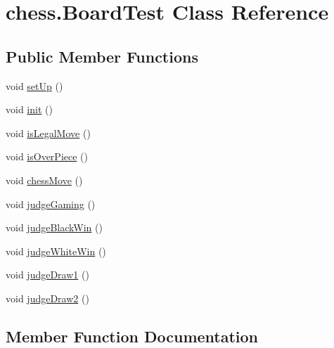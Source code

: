 \hypertarget{classchess_1_1_board_test}{}\section{chess.\+Board\+Test Class Reference}
\label{classchess_1_1_board_test}
\subsection*{Public Member Functions}
\begin{DoxyCompactItemize}
\item 
void \mbox{\hyperlink{classchess_1_1_board_test_acd0ea30fd3e9742c6b71a5ee60b65707}{set\+Up}} ()
\item 
void \mbox{\hyperlink{classchess_1_1_board_test_a74abc15f67e30a9464758c1bf5dccbff}{init}} ()
\item 
void \mbox{\hyperlink{classchess_1_1_board_test_abd189ec57b7236f5482df6d2121898e6}{is\+Legal\+Move}} ()
\item 
void \mbox{\hyperlink{classchess_1_1_board_test_a844fc9d2b643df169a9b74a1983ce9ba}{is\+Over\+Piece}} ()
\item 
void \mbox{\hyperlink{classchess_1_1_board_test_ad2614964ffa53b71ba2cccc28e103132}{chess\+Move}} ()
\item 
void \mbox{\hyperlink{classchess_1_1_board_test_ab027906c63e88c5024784d8f61f6c632}{judge\+Gaming}} ()
\item 
void \mbox{\hyperlink{classchess_1_1_board_test_ad40ac3593566417a81427839b45a0386}{judge\+Black\+Win}} ()
\item 
void \mbox{\hyperlink{classchess_1_1_board_test_a9eba77bc50638d378f650d30ea79f44b}{judge\+White\+Win}} ()
\item 
void \mbox{\hyperlink{classchess_1_1_board_test_a8fc68b54ebdf9823e0422ecdaf4522e1}{judge\+Draw1}} ()
\item 
void \mbox{\hyperlink{classchess_1_1_board_test_ad4523d7eaf28497a4eae4d1cc6aff53d}{judge\+Draw2}} ()
\end{DoxyCompactItemize}


\subsection{Member Function Documentation}
\mbox{\label{classchess_1_1_board_test_ad2614964ffa53b71ba2cccc28e103132}} 
